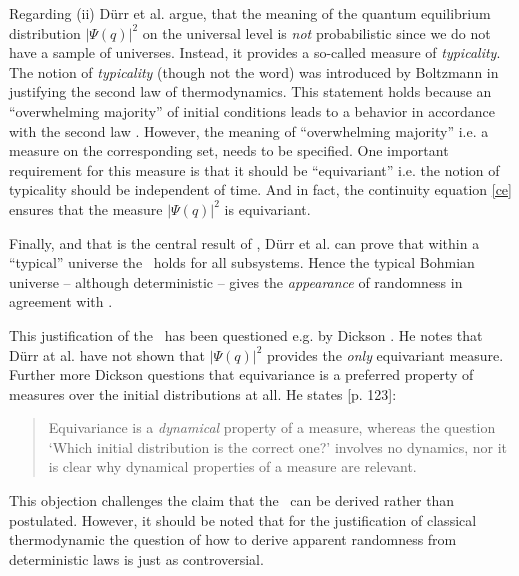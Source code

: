 Regarding (ii)  D\"urr et al. argue, that the meaning of the quantum equilibrium distribution $|\Psi(q)|^2$ on the universal level 
is {\em not} probabilistic since we do not have a sample of universes. Instead, it provides a so-called  measure of 
{\em typicality}. The notion of  {\em typicality} (though not the word) was introduced by Boltzmann in justifying the 
second law of thermodynamics. This statement holds because an ``overwhelming majority'' of initial conditions leads to a behavior in 
accordance with the second law \cite{lebowitz}. However, the meaning of ``overwhelming majority'' i.e. a measure on the corresponding set, needs 
to be specified. One important requirement for this measure is that it should be ``equivariant'' i.e. the notion of typicality 
should be independent of time. And in fact, the continuity equation \ref{ce} ensures that the measure  $|\Psi(q)|^2$ is equivariant. 

Finally, and that is the central result of \cite{dgz}, D\"urr et al. can prove that within a ``typical'' universe the \qeh\ holds 
for all subsystems. Hence the typical Bohmian universe -- although deterministic -- gives the {\em appearance} of randomness in 
agreement with \qm.

This justification of the \qeh\ has been questioned e.g. by Dickson \cite{dickson}. He notes that D\"urr at al. have not 
shown that  $|\Psi(q)|^2$ provides the {\em only} equivariant measure. Further more Dickson questions that 
equivariance is a preferred property of measures over the initial distributions at all.  He states \cite{dickson}[p. 123]:
\begin{quote}
Equivariance is a {\em dynamical} property of a measure, whereas the question `Which initial distribution is the correct one?' 
involves no dynamics, nor it is clear why dynamical properties of a measure are relevant. 
\end{quote}
This objection challenges the claim that the \qeh\ can be derived rather than postulated. However, it should be noted that for 
the justification of classical thermodynamic the question of how to derive apparent randomness from deterministic laws is
just as controversial.

